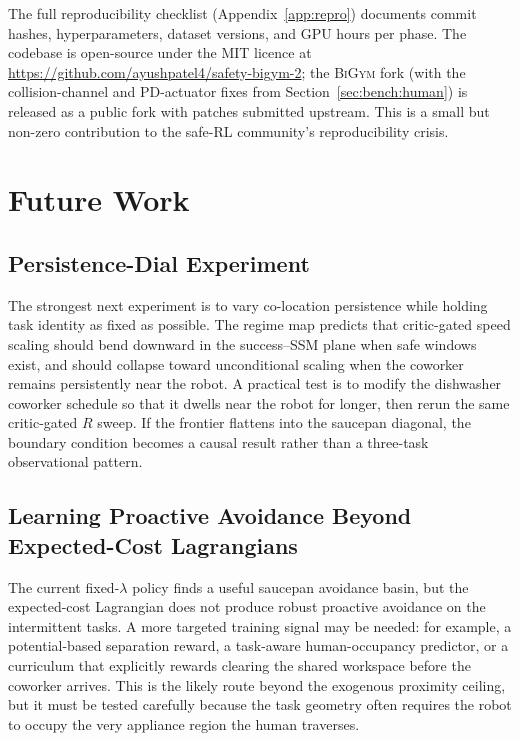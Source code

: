 \documentclass[11pt,a4paper]{report}
\newcommand{\bigym}{\textsc{BiGym}}
\begin{document}
The full reproducibility checklist (Appendix~\ref{app:repro})
documents commit hashes, hyperparameters, dataset versions, and
GPU hours per phase. The codebase is open-source under the MIT
licence at \url{https://github.com/ayushpatel4/safety-bigym-2}; the \bigym{} fork (with the
collision-channel and PD-actuator fixes from
Section~\ref{sec:bench:human}) is released as a public fork with
patches submitted upstream. This is a small but non-zero
contribution to the safe-RL community's reproducibility crisis.
\fi


\chapter{Future Work}
\label{ch:future}

\section{Persistence-Dial Experiment}
\label{sec:fw:persistence-dial}

The strongest next experiment is to vary co-location persistence while
holding task identity as fixed as possible. The regime map predicts
that critic-gated speed scaling should bend downward in the
success--SSM plane when safe windows exist, and should collapse toward
unconditional scaling when the coworker remains persistently near the
robot. A practical test is to modify the dishwasher coworker schedule
so that it dwells near the robot for longer, then rerun the same
critic-gated $R$ sweep. If the frontier flattens into the saucepan
diagonal, the boundary condition becomes a causal result rather than a
three-task observational pattern.

\section{Learning Proactive Avoidance Beyond Expected-Cost Lagrangians}
\label{sec:fw:proactive}

The current fixed-$\lambda$ policy finds a useful saucepan avoidance
basin, but the expected-cost Lagrangian does not produce robust
proactive avoidance on the intermittent tasks. A more targeted training
signal may be needed: for example, a potential-based separation reward,
a task-aware human-occupancy predictor, or a curriculum that explicitly
rewards clearing the shared workspace before the coworker arrives. This
is the likely route beyond the exogenous proximity ceiling, but it
must be tested carefully because the task geometry often requires the
robot to occupy the very appliance region the human traverses.
\end{document}
